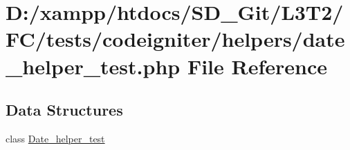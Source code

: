 \hypertarget{date__helper__test_8php}{}\section{D\+:/xampp/htdocs/\+S\+D\+\_\+\+Git/\+L3\+T2/\+F\+C/tests/codeigniter/helpers/date\+\_\+helper\+\_\+test.php File Reference}
\label{date__helper__test_8php}
\subsection*{Data Structures}
\begin{DoxyCompactItemize}
\item 
class \hyperlink{class_date__helper__test}{Date\+\_\+helper\+\_\+test}
\end{DoxyCompactItemize}
